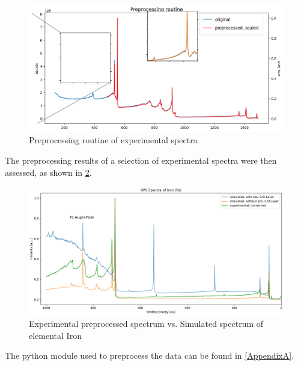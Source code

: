 \begin{figure}
    \centering
    \includegraphics[width=\textwidth]{Figures/preprocessing_routine.png}
    \caption{Preprocessing routine of experimental spectra}
    \label{fig:preproc_routine}
\end{figure}

The preprocessing results of a selection of experimental spectra were then assessed, as shown in \ref{fig:ex_vs_sim}.

\begin{figure}
    \centering
    \includegraphics[width=\textwidth]{Figures/Fe_XPS.png}
    \caption{Experimental preprocessed spectrum vs. Simulated spectrum of elemental Iron}
    \label{fig:ex_vs_sim}
\end{figure}

The python module used to preprocess the data can be found in \ref{AppendixA}.